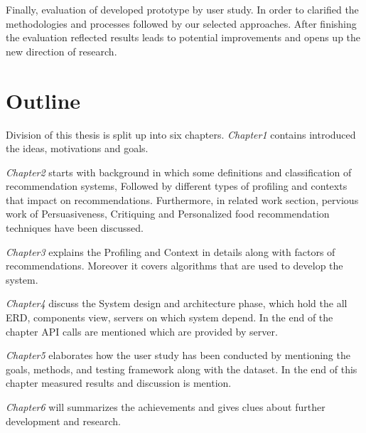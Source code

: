 Finally, evaluation of developed prototype by user study. In order to clarified the methodologies and processes followed by our selected approaches. After finishing the evaluation reflected results leads to potential improvements and opens up the new direction of research.\newline

\section{Outline}

Division of this thesis is split up into six chapters. \textit{Chapter1} contains introduced the ideas, motivations and goals.\newline

\textit{Chapter2} starts with background in which some definitions and classification of recommendation systems, Followed by different types of profiling and contexts that impact on recommendations. Furthermore, in related work section, pervious work of Persuasiveness, Critiquing and Personalized food recommendation techniques have been discussed.\newline

\textit{Chapter3} explains the Profiling and Context in details along with factors of recommendations. Moreover it covers algorithms that are used to develop the system.\newline

\textit{Chapter4} discuss the System design and architecture phase, which hold the all ERD, components view, servers on which system depend. In the end of the chapter API calls are mentioned which are provided by server.\newline

\textit{Chapter5} elaborates how the user study has been conducted by mentioning the goals, methods, and testing framework along with the dataset. In the end of this chapter measured results and discussion is mention.\newline
  
\textit{Chapter6} will summarizes the achievements and gives clues about further development and research.\newline
